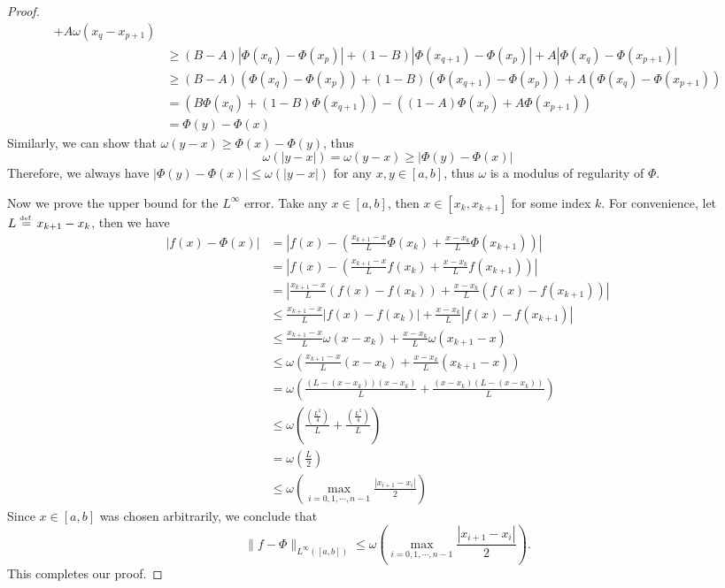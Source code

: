 \documentclass{article}
\numberwithin{equation}{section}
\theoremstyle{definition}
\newcommand{\eqdef}{\ensuremath{\stackrel{\mbox{\upshape\tiny def.}}{=}}}
\begin{document}
\begin{proof}
\begin{align*}
    + A \omega (x_q - x_{p+1})
    \\
    &\ge (B-A) |\Phi(x_q) - \Phi(x_p)|
    + (1-B) |\Phi(x_{q+1}) - \Phi(x_p)|
    + A |\Phi(x_q) - \Phi(x_{p+1})|
    \\
    &\ge (B-A) (\Phi(x_q) - \Phi(x_p))
    + (1-B) (\Phi(x_{q+1}) - \Phi(x_p))
    + A (\Phi(x_q) - \Phi(x_{p+1}))
    \\
    &= (B \Phi(x_q) + (1-B) \Phi(x_{q+1})) 
    - ((1-A) \Phi(x_p) + A \Phi(x_{p+1}))
    \\
    &= \Phi(y) - \Phi(x)
\end{align*}
Similarly, we can show that $\omega(y-x) \ge \Phi(x) - \Phi(y)$, thus 
$$\omega(|y-x|) = \omega(y-x) \ge |\Phi(y) - \Phi(x)|$$
Therefore, we always have $|\Phi(y) - \Phi(x)| \le \omega(|y-x|)$ for any $x,y\in[a,b]$, thus $\omega$ is a modulus of regularity of $\Phi$.

Now we prove the upper bound for the $L^{\infty}$ error. Take any $x\in[a,b]$, then $x\in[x_k,x_{k+1}]$ for some index $k$. For convenience, let $L \eqdef x_{k+1}-x_k$, then we have 
\allowdisplaybreaks
\begin{align*}
    |f(x) - \Phi(x)|
    &= 
    \left| f(x) - 
        \left(
            \frac{x_{k+1}-x}{L} \Phi(x_k)
            + \frac{x-x_k}{L} \Phi(x_{k+1})
        \right) 
    \right|
    \\
    &=\left| f(x) - \left(
        \frac{x_{k+1}-x}{L} f(x_k)
        + \frac{x-x_k}{L} f(x_{k+1})
    \right) \right|
    \\
    &=
    \left|
    \frac{x_{k+1}-x}{L} (f(x) - f(x_k))
    +
    \frac{x-x_k}{L} (f(x) - f(x_{k+1}))
    \right|
    \\
    &\le 
    \frac{x_{k+1}-x}{L} |f(x) - f(x_k)|
    +
    \frac{x-x_k}{L} |f(x) - f(x_{k+1})|
    \\
    &\le
    \frac{x_{k+1}-x}{L} \omega(x - x_k)
    +
    \frac{x-x_k}{L} \omega(x_{k+1} - x)
    \\
    &\le
    \omega \left(
        \frac{x_{k+1}-x}{L} (x - x_k)
        +
        \frac{x-x_k}{L} (x_{k+1} - x)
    \right)
    \\
    &= 
    \omega \left(
        \frac{(L-(x - x_k))(x - x_k)}{L} 
        +
        \frac{(x - x_k)(L-(x - x_k))}{L} 
    \right)
    \\
    &\le
    \omega \left(
        \frac{\left(\frac{L^2}{4}\right)}{L} 
        +
        \frac{\left(\frac{L^2}{4}\right)}{L} 
    \right)
    \\
    &=
    \omega\left( \frac{L}{2} \right)
    \\
    &\le
    \omega \left(
    \max\limits_{i=0,1,\cdots,n-1}{\frac{|x_{i+1}-x_i|}{2}}
    \right)
\end{align*}
Since $x\in[a,b]$ was chosen arbitrarily, we conclude that 
$$\| f-\Phi \|_{L^{\infty}([a,b])} \le \omega \left(
    \max\limits_{i=0,1,\cdots,n-1}{\frac{|x_{i+1}-x_i|}{2}}
\right).
$$
This completes our proof.
\end{proof}
\end{document}
